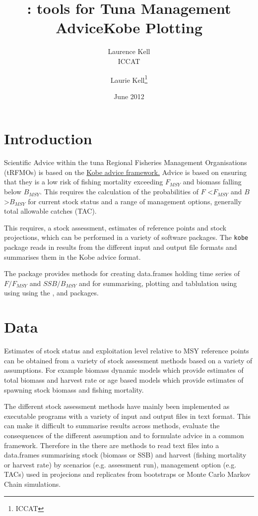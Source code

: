 \documentclass[shortnames,nojss,article]{jss}
\author{Laurence Kell\\ICCAT}
\title{\pkg{kobe}: \proglang{R} tools for Tuna Management Advice}
\begin{document}


\title{Kobe Plotting}
\author{Laurie Kell\footnote{ICCAT}}
\date{June 2012}
\maketitle

\tableofcontents

\section{Introduction}

Scientific Advice within the tuna Regional Fisheries Management Organisations (tRFMOs) is based on the
\href{http://www.tuna-org.org/Documents/TRFMO3/K3-REC_ENG.pdf}{Kobe advice framework.} 
Advice is based on ensuring that they is a low risk of fishing mortality exceeding $F_{MSY}$ and biomass falling below $B_{MSY}$. 
This requires the calculation of the probabilities of $F$ \textless  $F_{MSY}$ and $B$ \textgreater $B_{MSY}$ for current stock status and a 
range of management options, generally total allowable catches (TAC).  

This requires, a stock assessment, estimates of reference points and stock projections, which can be performed in a variety of
software packages. The \texttt{kobe} package reads in results from the different input and output file formats and summarises 
them in the Kobe advice format.

The package provides methods for creating data.frames holding time series of $F/F_{MSY}$ and $SSB/B_{MSY}$ and for summarising, 
plotting and tablulation using using using the ,  and  packages.


\section{Data}

Estimates of stock status and exploitation level relative to MSY reference points can be obtained from a variety of stock assessment 
methods based on a variety of assumptions. For example biomass dynamic models which provide estimates of total biomass and harvest rate or 
age based models which provide estimates of spawning stock biomass and fishing mortality.

The different stock assessment methods have mainly been implemented as executable programs with a variety of input and output files 
in text format.  This can make it difficult to summarise results across methods, evaluate the consequences of the different assumption 
and to formulate advice in a common framework. Therefore in the  there are methods to read text files into a 
data.frames summarising stock (biomass or SSB) and harvest (fishing mortality or harvest rate) by scenarios (e.g. assessment run), 
management option (e.g. TACs) used in projecions and replicates from bootstraps or Monte Carlo Markov Chain simulations.
\end{document}
